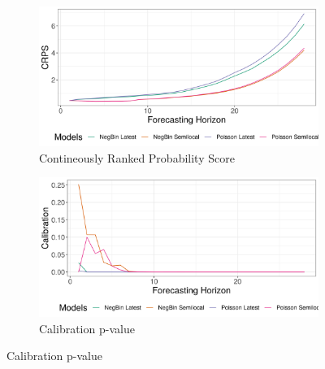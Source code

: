 \begin{figure}[H]
\begin{subfigure}{0.5\textwidth}
  \centering
  \includegraphics[width=\linewidth]{../output/Mabalako_crps.png}  
  \caption{Contineously Ranked Probability Score}
  \label{fig:sub-first}
\end{subfigure}
\begin{subfigure}{0.5\textwidth}
  \centering
  \includegraphics[width=\linewidth]{../output/Mabalako_calibration.png}  
  \caption{Calibration p-value}
  \label{fig:sub-second}
\end{subfigure}


\end{figure}
